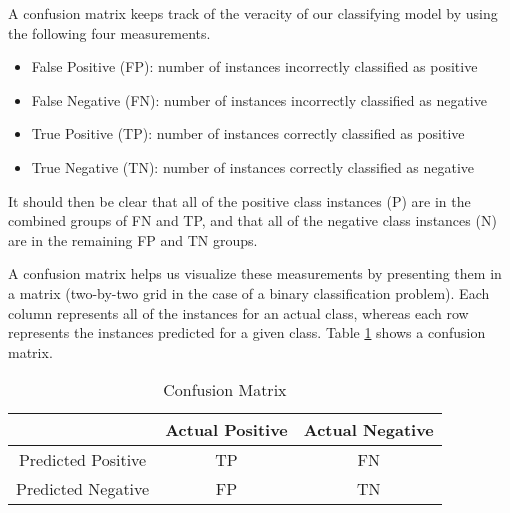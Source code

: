 A confusion matrix keeps track of the veracity of our classifying model by using the following four measurements.

\begin{itemize}
\item False Positive (FP): number of instances incorrectly classified as positive
\item False Negative (FN): number of instances incorrectly classified as negative
\item True Positive (TP): number of instances correctly classified as positive
\item True Negative (TN): number of instances correctly classified as negative
\end{itemize}

It should then be clear that all of the positive class instances (P) are in the combined groups of FN and TP, and that all of the negative class instances (N) are in the remaining FP and TN groups.

A confusion matrix helps us visualize these measurements by presenting them in a matrix (two-by-two grid in the case of a binary classification problem). Each column represents all of the instances for an actual class, whereas each row represents the instances predicted for a given class. Table \ref{table:confusion_matrix} shows a confusion matrix.

\begin{table}[]
\centering
\caption{Confusion Matrix\label{table:confusion_matrix}}
\begin{tabular}{|c|c|c|}
\hline
                   & Actual Positive & Actual Negative \\ \hline
Predicted Positive & TP              & FN              \\ \hline
Predicted Negative & FP              & TN              \\ \hline
\end{tabular}
\end{table}

